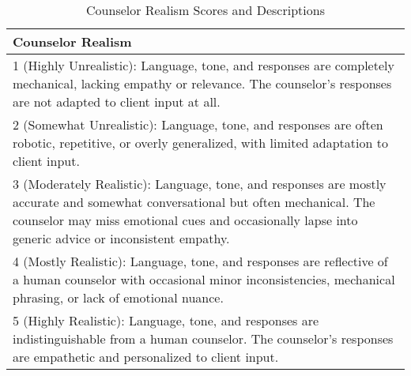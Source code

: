 \begin{table*}[tb]
\begin{tabularx}{\textwidth}{X}
\toprule
\textbf{Counselor Realism} \\ \midrule
1 (Highly Unrealistic): Language, tone, and responses are completely mechanical, lacking empathy or relevance. The counselor's responses are not adapted to client input at all.                  \\
2 (Somewhat Unrealistic): Language, tone, and responses are often robotic, repetitive, or overly generalized, with limited adaptation to client input.      \\
3 (Moderately Realistic): Language, tone, and responses are mostly accurate and somewhat conversational but often mechanical. The counselor may miss emotional cues and occasionally lapse into generic advice or inconsistent empathy. \\
4 (Mostly Realistic): Language, tone, and responses are reflective of a human counselor with occasional minor inconsistencies, mechanical phrasing, or lack of emotional nuance. \\
5 (Highly Realistic): Language, tone, and responses are indistinguishable from a human counselor. The counselor's responses are empathetic and personalized to client input. \\
\bottomrule                            
\end{tabularx}
\caption{Counselor Realism Scores and Descriptions}
\label{tab:counselor realism}
\end{table*}

